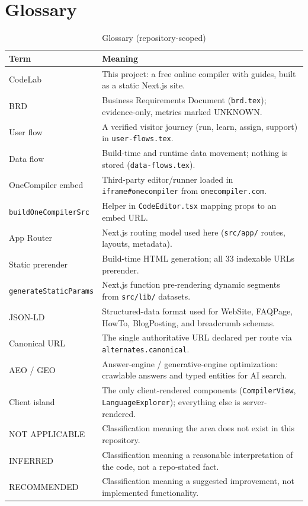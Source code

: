 \section{Glossary}
\label{sec:glossary}

\begin{table}[H]
\centering
\caption{Glossary (repository-scoped)}
\begin{tabular}{|l|p{9.5cm}|}
\hline
\textbf{Term} & \textbf{Meaning} \\ \hline
CodeLab & This project: a free online compiler with guides, built as a static Next.js site. \\ \hline
BRD & Business Requirements Document (\texttt{brd.tex}); evidence-only, metrics marked UNKNOWN. \\ \hline
User flow & A verified visitor journey (run, learn, assign, support) in \texttt{user-flows.tex}. \\ \hline
Data flow & Build-time and runtime data movement; nothing is stored (\texttt{data-flows.tex}). \\ \hline
OneCompiler embed & Third-party editor/runner loaded in \texttt{iframe\#onecompiler} from \texttt{onecompiler.com}. \\ \hline
\texttt{buildOneCompilerSrc} & Helper in \texttt{CodeEditor.tsx} mapping props to an embed URL. \\ \hline
App Router & Next.js routing model used here (\texttt{src/app/} routes, layouts, metadata). \\ \hline
Static prerender & Build-time HTML generation; all 33 indexable URLs prerender. \\ \hline
\texttt{generateStaticParams} & Next.js function pre-rendering dynamic segments from \texttt{src/lib/} datasets. \\ \hline
JSON-LD & Structured-data format used for WebSite, FAQPage, HowTo, BlogPosting, and breadcrumb schemas. \\ \hline
Canonical URL & The single authoritative URL declared per route via \texttt{alternates.canonical}. \\ \hline
AEO / GEO & Answer-engine / generative-engine optimization: crawlable answers and typed entities for AI search. \\ \hline
Client island & The only client-rendered components (\texttt{CompilerView}, \texttt{LanguageExplorer}); everything else is server-rendered. \\ \hline
NOT APPLICABLE & Classification meaning the area does not exist in this repository. \\ \hline
INFERRED & Classification meaning a reasonable interpretation of the code, not a repo-stated fact. \\ \hline
RECOMMENDED & Classification meaning a suggested improvement, not implemented functionality. \\ \hline
\end{tabular}
\end{table}
